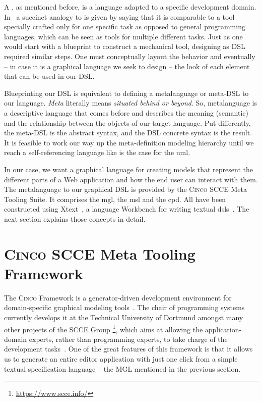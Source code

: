 A , as mentioned before, is a language adapted to a specific development domain. In~\cite{Naujokat2018} a succinct analogy to  is given by saying that it is comparable to a tool specially crafted only for one specific task as opposed to general programming languages, which can be seen as tools for multiple different tasks. Just as one would start with a blueprint to construct a mechanical tool, designing as DSL required similar steps. One must conceptually layout the behavior and eventually -- in case it is a graphical language we seek to design -- the look of each element that can be used in our DSL.

Blueprinting our DSL is equivalent to defining a metalanguage or meta-DSL to our language. \textit{Meta} literally means \textit{situated behind or beyond}\cite{merriam}. So, metalanguage is a descriptive language that comes before and describes the meaning (semantic) and the relationship between the objects of our target language. Put differently, the meta-DSL is the abstract syntax, and the DSL concrete syntax is the result. It is feasible to work our way up the meta-definition modeling hierarchy until we reach a self-referencing language like is the case for the \gls{uml}.

In our case, we want a graphical language for creating models that represent the different parts of a Web application and how the end user can interact with them. The metalanguage to our graphical DSL is provided by the \textsc{Cinco} SCCE Meta Tooling Suite. It comprises the \gls{mgl}, the \gls{msl} and the \gls{cpd}. All have been constructed using Xtext~\cite{bettini2016implementing}, a language Workbench for writing textual \glspl*{dsl}~\cite{naujokat-diss}. The next section explains those concepts in detail.

\section{\textsc{Cinco SCCE} Meta Tooling Framework}\label{sec:cincoFW}


The \textsc{Cinco} Framework is a generator-driven development environment for domain-specific graphical modeling tools~\cite{Cinco}. The chair of programming systems currently develops it at the Technical University of Dortmund amongst many other projects of the SCCE Group \footnote[1]{\url{https://www.scce.info/}}, which aims at allowing the application-domain experts, rather than programming experts, to take charge of the development tasks~\cite{scce}. One of the great features of this framework is that it allows us to generate an entire editor application with just one click from a simple textual specification language -- the MGL mentioned in the previous section. 


